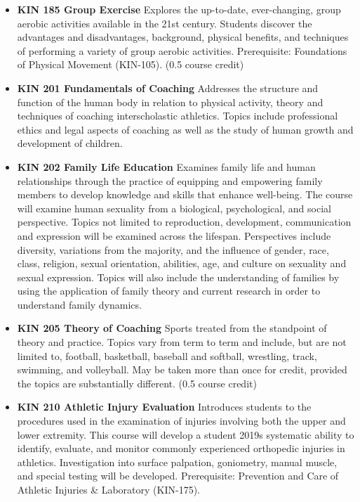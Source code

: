\documentclass[
  letterpaper,
]{scrbook}
\begin{document}
\begin{itemize}
\item
  \textbf{KIN 185 Group Exercise} Explores the up-to-date,
  ever-changing, group aerobic activities available in the 21st century.
  Students discover the advantages and disadvantages, background,
  physical benefits, and techniques of performing a variety of group
  aerobic activities. Prerequisite: Foundations of Physical Movement
  (KIN-105). (0.5 course credit)
\item
  \textbf{KIN 201 Fundamentals of Coaching} Addresses the structure and
  function of the human body in relation to physical activity, theory
  and techniques of coaching interscholastic athletics. Topics include
  professional ethics and legal aspects of coaching as well as the study
  of human growth and development of children.
\item
  \textbf{KIN 202 Family Life Education} Examines family life and human
  relationships through the practice of equipping and empowering family
  members to develop knowledge and skills that enhance well-being. The
  course will examine human sexuality from a biological, psychological,
  and social perspective. Topics not limited to reproduction,
  development, communication and expression will be examined across the
  lifespan. Perspectives include diversity, variations from the
  majority, and the influence of gender, race, class, religion, sexual
  orientation, abilities, age, and culture on sexuality and sexual
  expression. Topics will also include the understanding of families by
  using the application of family theory and current research in order
  to understand family dynamics.
\item
  \textbf{KIN 205 Theory of Coaching} Sports treated from the standpoint
  of theory and practice. Topics vary from term to term and include, but
  are not limited to, football, basketball, baseball and softball,
  wrestling, track, swimming, and volleyball. May be taken more than
  once for credit, provided the topics are substantially different. (0.5
  course credit)
\item
  \textbf{KIN 210 Athletic Injury Evaluation} Introduces students to the
  procedures used in the examination of injuries involving both the
  upper and lower extremity. This course will develop a student 2019s
  systematic ability to identify, evaluate, and monitor commonly
  experienced orthopedic injuries in athletics. Investigation into
  surface palpation, goniometry, manual muscle, and special testing will
  be developed. Prerequisite: Prevention and Care of Athletic Injuries
  \& Laboratory (KIN-175).

\end{itemize}
\end{document}
